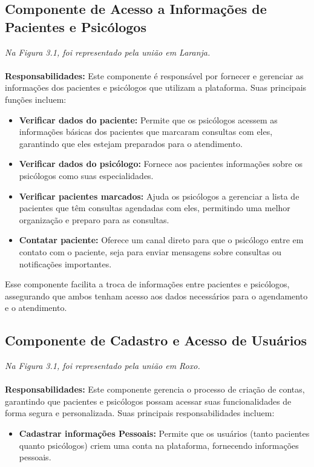 \documentclass[a4paper,12pt]{report}
\begin{document}
\subsection{Componente de Acesso a Informações de Pacientes e Psicólogos}
\textit{Na Figura 3.1, foi representado pela união em Laranja.} \\ 
\\
\textbf{Responsabilidades:} 
Este componente é responsável por fornecer e gerenciar as informações dos pacientes e psicólogos que utilizam a plataforma. Suas principais funções incluem:
\begin{itemize}
    \item \textbf{Verificar dados do paciente:}  Permite que os psicólogos acessem as informações básicas dos pacientes que marcaram consultas com eles, garantindo que eles estejam preparados para o atendimento.
    \item \textbf{Verificar dados do psicólogo:} Fornece aos pacientes informações sobre os psicólogos como suas especialidades.
    \item \textbf{Verificar pacientes marcados:} Ajuda os psicólogos a gerenciar a lista de pacientes que têm consultas agendadas com eles, permitindo uma melhor organização e preparo para as consultas.
    \item \textbf{Contatar paciente:} Oferece um canal direto para que o psicólogo entre em contato com o paciente, seja para enviar mensagens sobre consultas ou notificações importantes.
\end{itemize}

Esse componente facilita a troca de informações entre pacientes e psicólogos, assegurando que ambos tenham acesso aos dados necessários para o agendamento e o atendimento.

\subsection{ Componente de Cadastro e Acesso de Usuários}
\textit{Na Figura 3.1, foi representado pela união em Roxo.} \\ 
\\
\textbf{Responsabilidades:} 
Este componente gerencia o processo de criação de contas, garantindo que pacientes e psicólogos possam acessar suas funcionalidades de forma segura e personalizada. Suas principais responsabilidades incluem:

\begin{itemize}
    \item \textbf{Cadastrar informações Pessoais:} Permite que os usuários (tanto pacientes quanto psicólogos) criem uma conta na plataforma, fornecendo informações pessoais.
\end{itemize}
\end{document}

